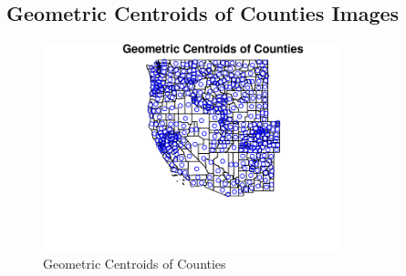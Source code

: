
\subsection{Geometric Centroids of Counties Images} 
 

\begin{figure} 
\centering  
\includegraphics[width=0.77\textwidth]{Code_Outputs/CountyGeometricCentroids_MapLocations.pdf} 
\caption{\label{fig:CountyGeometricCentroidsMapLocations}Geometric Centroids of Counties} 
\end{figure} 
 

